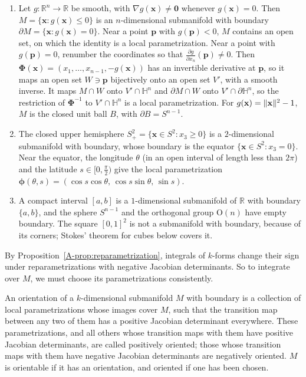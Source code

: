 \begin{example}\label{A-ex:manifolds-boundary}
    \begin{enumerate}
        \item Let $g: \mathbb{R}^n \to \mathbb{R}$ be smooth, with $\nabla g(\mathbf{x}) \neq \mathbf{0}$ whenever $g(\mathbf{x}) = 0$. Then $M = \{\mathbf{x} : g(\mathbf{x}) \leq 0\}$ is an $n$-dimensional submanifold with boundary $\partial M = \{\mathbf{x} : g(\mathbf{x}) = 0\}$. Near a point $\mathbf{p}$ with $g(\mathbf{p}) < 0$, $M$ contains an open set, on which the identity is a local parametrization. Near a point with $g(\mathbf{p}) = 0$, renumber the coordinates so that $\frac{\partial g}{\partial x_n}(\mathbf{p}) \neq 0$. Then $\boldsymbol{\Phi}(\mathbf{x}) = (x_1, \ldots, x_{n-1}, -g(\mathbf{x}))$ has an invertible derivative at $\mathbf{p}$, so it maps an open set $W \ni \mathbf{p}$ bijectively onto an open set $V'$, with a smooth inverse. It maps $M \cap W$ onto $V' \cap \mathbb{H}^n$ and $\partial M \cap W$ onto $V' \cap \partial\mathbb{H}^n$, so the restriction of $\boldsymbol{\Phi}^{-1}$ to $V' \cap \mathbb{H}^n$ is a local parametrization. For $g(\mathbf{x}) = \lVert \mathbf{x} \rVert^2 - 1$, $M$ is the closed unit ball $B$, with $\partial B = S^{n-1}$.
        \item The closed upper hemisphere $S^2_+ = \{\mathbf{x} \in S^2 : x_3 \geq 0\}$ is a $2$-dimensional submanifold with boundary, whose boundary is the equator $\{\mathbf{x} \in S^2 : x_3 = 0\}$. Near the equator, the longitude $\theta$ (in an open interval of length less than $2\pi$) and the latitude $s \in [0, \frac{\pi}{2})$ give the local parametrization $\boldsymbol{\phi}(\theta, s) = (\cos s\cos\theta, \, \cos s\sin\theta, \, \sin s)$.
        \item A compact interval $[a, b]$ is a $1$-dimensional submanifold of $\mathbb{R}$ with boundary $\{a, b\}$, and the sphere $S^{n-1}$ and the orthogonal group $\mathrm{O}(n)$ have empty boundary. The square $[0, 1]^2$ is not a submanifold with boundary, because of its corners; Stokes' theorem for cubes below covers it.
    \end{enumerate}
\end{example}

By Proposition~\ref{A-prop:reparametrization}, integrals of $k$-forms change their sign under reparametrizations with negative Jacobian determinants. So to integrate over $M$, we must choose its parametrizations consistently.

\begin{definition}[Orientation]\label{A-def:orientation}
    An orientation of a $k$-dimensional submanifold $M$ with boundary is a collection of local parametrizations whose images cover $M$, such that the transition map between any two of them has a positive Jacobian determinant everywhere. These parametrizations, and all others whose transition maps with them have positive Jacobian determinants, are called positively oriented; those whose transition maps with them have negative Jacobian determinants are negatively oriented. $M$ is orientable if it has an orientation, and oriented if one has been chosen.
\end{definition}

